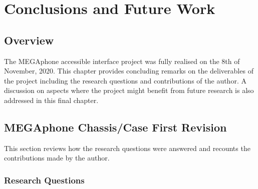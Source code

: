 
\chapter{Conclusions and Future Work} %

\label{Chapter6} %


\section{Overview}
The MEGAphone accessible interface project was fully realised on the 8th of November, 2020.
This chapter provides concluding remarks on the deliverables of the project including the research questions and contributions of the author.
A discussion on aspects where the project might benefit from future research is also addressed in this final chapter.


\section{MEGAphone Chassis/Case First Revision}
This section reviews how the research questions were answered and recounts the contributions made by the author.

\subsection{Research Questions}

